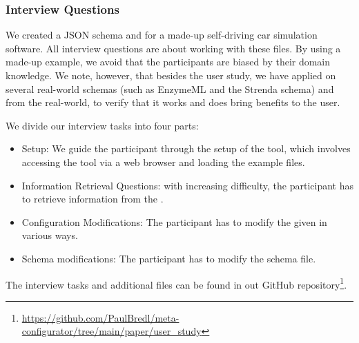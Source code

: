 \subsubsection{Interview Questions}
We created a JSON schema and \cfgfile{} for a made-up self-driving car simulation software.
All interview questions are about working with these files.
By using a made-up example, we avoid that the participants are biased by their domain knowledge.
We note, however, that besides the user study, we have applied \toolname{} on several real-world schemas (such as EnzymeML\cite{pyenzyme} and the Strenda schema\cite{strenda}) and \cfgfiles{} from the real-world, to verify that it works and does bring benefits to the user.

We divide our interview tasks into four parts:
\begin{itemize}
    \item Setup: We guide the participant through the setup of the tool, which involves accessing the tool via a web browser and loading the example files.
    \item Information Retrieval Questions: with increasing difficulty, the participant has to retrieve information from the \cfgfile{}.
    \item Configuration Modifications: The participant has to modify the given \cfgfile{} in various ways.
    \item Schema modifications: The participant has to modify the schema file.
\end{itemize}

The interview tasks and additional files can be found in out GitHub repository\footnote{\url{https://github.com/PaulBredl/meta-configurator/tree/main/paper/user_study}}.

